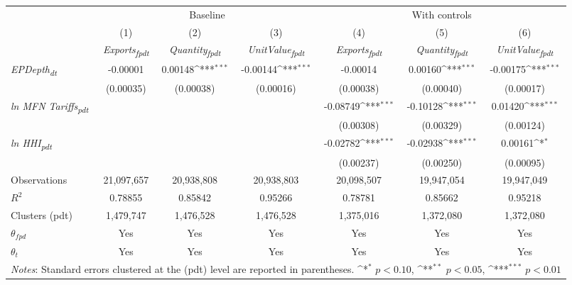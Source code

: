 {
\def\sym#1{\ifmmode^{#1}\else\(^{#1}\)\fi}
\begin{tabular}{l*{6}{c}}
\toprule
&\multicolumn{3}{c}{Baseline}&\multicolumn{3}{c}{With controls}\\\cmidrule(lr){2-4}\cmidrule(lr){5-7}
&(1)&(2)&(3)&(4)&(5)&(6)\\
&\textit{Exports\textsubscript{fpdt}}&\textit{Quantity\textsubscript{fpdt}}&\textit{UnitValue\textsubscript{fpdt}}&\textit{Exports\textsubscript{fpdt}}&\textit{Quantity\textsubscript{fpdt}}&\textit{UnitValue\textsubscript{fpdt}}\\
\midrule
\textit{EPDepth\textsubscript{dt}} & -0.00001 & 0.00148\sym{***} & -0.00144\sym{***} & -0.00014 & 0.00160\sym{***} & -0.00175\sym{***}\\
 & (0.00035) & (0.00038) & (0.00016) & (0.00038) & (0.00040) & (0.00017)\\
\addlinespace
\textit{ln MFN Tariffs\textsubscript{pdt}} &  &  &  & -0.08749\sym{***} & -0.10128\sym{***} & 0.01420\sym{***}\\
 &  &  &  & (0.00308) & (0.00329) & (0.00124)\\
\addlinespace
\textit{ln HHI\textsubscript{pdt}} &  &  &  & -0.02782\sym{***} & -0.02938\sym{***} & 0.00161\sym{*}\\
 &  &  &  & (0.00237) & (0.00250) & (0.00095)\\
\midrule
Observations & 21,097,657 & 20,938,808 & 20,938,803 & 20,098,507 & 19,947,054 & 19,947,049\\
$R^{2}$ & 0.78855 & 0.85842 & 0.95266 & 0.78781 & 0.85662 & 0.95218\\
Clusters (pdt) & 1,479,747 & 1,476,528 & 1,476,528 & 1,375,016 & 1,372,080 & 1,372,080\\
$\theta_{fpd}$ & Yes & Yes & Yes & Yes & Yes & Yes\\
$\theta_{t}$ & Yes & Yes & Yes & Yes & Yes & Yes\\
\bottomrule
\multicolumn{7}{l}{\footnotesize \textit{Notes}: Standard errors clustered at the (pdt) level are reported in parentheses. \sym{*} \(p<0.10\), \sym{**} \(p<0.05\), \sym{***} \(p<0.01\)}\\
\end{tabular}
}
